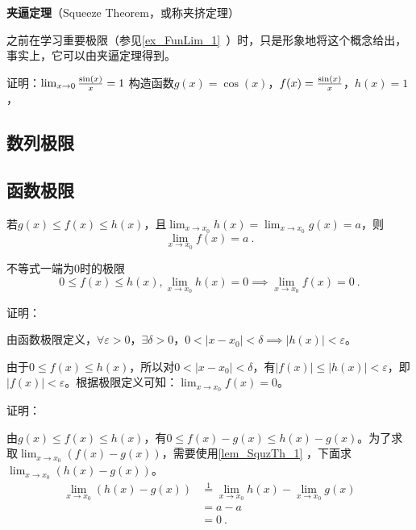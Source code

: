 
\begin{issues}
\issueDraft
\end{issues}
\textbf{夹逼定理}（Squeeze Theorem，或称夹挤定理）

之前在学习重要极限（参见\autoref{ex_FunLim_1}~）时，只是形象地将这个概念给出，事实上，它可以由夹逼定理得到。
\begin{example}{证明：$\lim_{x\to0}{\sin(x)\over x}=1$}
构造函数$g(x)=\cos(x)$，$f(x)={\sin(x)\over x}$，$h(x)=1$，
\end{example}

\subsection{数列极限}

\subsection{函数极限}

若$g(x)\leq f(x)\leq h(x)$，且$\lim _{x\to x_0}h(x)=\lim _{x\to x_0}g(x)=a$，则
\begin{equation}
\lim _{x\to x_0}f(x)=a~.
\end{equation}

\begin{lemma}{不等式一端为0时的极限}\label{lem_SquzTh_1}
\begin{equation}
0\leq f(x)\leq h(x),\lim _{x\to x_0}h(x)=0\implies\lim _{x\to x_0}f(x)=0~.
\end{equation}

证明：

由函数极限定义，$\forall\varepsilon>0$，$\exists\delta>0$，$0<|x-x_0|<\delta\implies|h(x)|<\varepsilon$。

由于$0\leq f(x)\leq h(x)$，所以对$0<|x-x_0|<\delta$，有$|f(x)|\leq |h(x)|<\varepsilon$，即$|f(x)|<\varepsilon$。根据极限定义可知：$\lim _{x\to x_0}f(x)=0$。

\end{lemma}

证明：

由$g(x)\leq f(x)\leq h(x)$，有$0\leq f(x)-g(x)\leq h(x)-g(x)$。为了求取$\lim _{x\to x_0}(f(x)-g(x))$，需要使用\autoref{lem_SquzTh_1} ，下面求$\lim _{x\to x_0}(h(x)-g(x))$。
$$
\begin{align*}
\lim _{x\to x_0}(h(x)-g(x))&\overset{\mathrm{1}}{=}\lim _{x\to x_0}h(x)-\lim _{x\to x_0}g(x)\\
&=a-a\\
&=0~.
\end{align*}
$$


